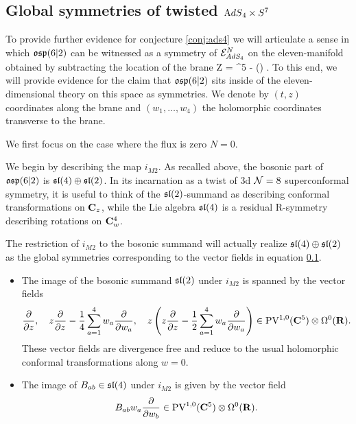 \documentclass[../main.tex]{subfiles}
\begin{document}
\subsection{Global symmetries of twisted ${\mathrm{A}dS}_4 \times S^7$}

To provide further evidence for conjecture \ref{conj:ads4} we will articulate a sense in which $\mathfrak{osp}(6|2)$ can be witnessed as a symmetry of $\mathcal{E}^N_{AdS_4}$ on the eleven-manifold obtained by subtracting the location of the brane
\beqn
\til Z = \R \times \C^5 - (\R \times \C {}) .
\eeqn
To this end, we will provide evidence for the claim that $\mathfrak{osp}(6|2)$ sits inside of the eleven-dimensional theory on this space as symmetries.
We denote by $(t,z)$ coordinates along the brane and $(w_1,\ldots,w_4)$ the holomorphic coordinates transverse to the brane.

We first focus on the case where the flux is zero $N=0$. 

\parsec[] 

We begin by describing the map $i_{M2}$. As recalled above, the bosonic part of $\mathfrak{osp}(6|2)$ is $\mathfrak{sl}(4)\oplus \mathfrak{sl}(2)$. In its incarnation as a twist of 3d $\mathcal{N}=8$ superconformal symmetry, it is useful to think of the $\mathfrak{sl}(2)$-summand as describing conformal transformations on $\mathbf{C}_z$, while the Lie algebra $\mathfrak{sl}(4)$ is a residual R-symmetry describing rotations on $\mathbf{C}^4_w$.

The restriction of $i_{M2}$ to the bosonic summand will actually realize $\mathfrak{sl}(4)\oplus \mathfrak{sl}(2)$ as the global symmetries corresponding to the vector fields in equation \ref{}.
\begin{itemize}
\item The image of the bosonic summand $\mathfrak{sl}(2)$ under $i_{M2}$ is spanned by the vector fields
\[
\frac{\partial}{\partial z} ,\quad z \frac{\partial}{\partial z} - \frac14 \sum_{a=1}^4 w_a \frac{\partial}{\partial w_a} , \quad z \left(z \frac{\partial}{\partial z} - \frac12 \sum_{a=1}^4 w_a \frac{\partial}{\partial w_a} \right) \in \text{PV}^{1,0}(\mathbf{C}^5) \otimes \Omega^0(\mathbf{R}).
\]
These vector fields are divergence free and reduce to the usual holomorphic conformal transformations along $w=0$.
\item The image of $B_{ab}\in \mathfrak{sl}(4)$ under $i_{M2}$ is given by the vector field
\[
B_{ab} w_a \frac{\partial}{\partial w_b} \in \text{PV}^{1,0}(\mathbf{C}^5) \otimes \Omega^0(\mathbf{R}).
\]
\end{itemize}
\end{document}
